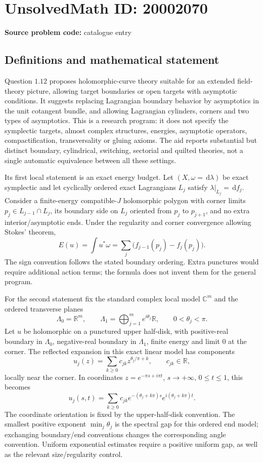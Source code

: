 \documentclass[11pt]{article}
\newcommand{\R}{\mathbb{R}}
\newcommand{\C}{\mathbb{C}}
\newcommand{\dd}{\,\mathrm{d}}
\begin{document}
\section*{UnsolvedMath ID: 20002070}
\textbf{Source problem code:} catalogue entry
\subsection{Definitions and mathematical statement}
Question \(1.12\) proposes holomorphic-curve theory suitable for an extended field-theory picture, allowing target boundaries or open targets with asymptotic conditions. It suggests replacing Lagrangian boundary behavior by asymptotics in the unit cotangent bundle, and allowing Lagrangian cylinders, corners and two types of asymptotics. This is a research program: it does not specify the symplectic targets, almost complex structures, energies, asymptotic operators, compactification, transversality or gluing axioms. The aid reports substantial but distinct boundary, cylindrical, switching, sectorial and quilted theories, not a single automatic equivalence between all these settings.

Its first local statement is an exact energy budget. Let \((X,\omega=\dd\lambda)\) be exact symplectic and let cyclically ordered exact Lagrangians \(L_j\) satisfy \(\lambda|_{L_j}=\dd f_j\). Consider a finite-energy compatible-\(J\) holomorphic polygon with corner limits \(p_j\in L_{j-1}\cap L_j\), its boundary side on \(L_j\) oriented from \(p_j\) to \(p_{j+1}\), and no extra interior/asymptotic ends. Under the regularity and corner convergence allowing Stokes' theorem,
\[
 E(u)=\int u^*\omega
     =\sum_j\bigl(f_{j-1}(p_j)-f_j(p_j)\bigr).
\]
The sign convention follows the stated boundary ordering. Extra punctures would require additional action terms; the formula does not invent them for the general program.

For the second statement fix the standard complex local model \(\C^m\) and the ordered transverse planes
\[
 \Lambda_0=\R^m,\qquad
 \Lambda_1=\bigoplus_{j=1}^m e^{i\theta_j}\R,
 \qquad0<\theta_j<\pi.
\]
Let \(u\) be holomorphic on a punctured upper half-disk, with positive-real boundary in \(\Lambda_0\), negative-real boundary in \(\Lambda_1\), finite energy and limit \(0\) at the corner. The reflected expansion in this exact linear model has components
\[
 u_j(z)=\sum_{k\geq0}c_{jk}z^{\theta_j/\pi+k},\qquad c_{jk}\in\R,
\]
locally near the corner. In coordinates \(z=e^{-\pi s+i\pi t}\), \(s\to+\infty\), \(0\leq t\leq1\), this becomes
\[
 u_j(s,t)=\sum_{k\geq0}c_{jk}
       e^{-(\theta_j+k\pi)s}e^{i(\theta_j+k\pi)t}.
\]
The coordinate orientation is fixed by the upper-half-disk convention. The smallest positive exponent \(\min_j\theta_j\) is the spectral gap for this ordered end model; exchanging boundary/end conventions changes the corresponding angle convention. Uniform exponential estimates require a positive uniform gap, as well as the relevant size/regularity control.
\end{document}
